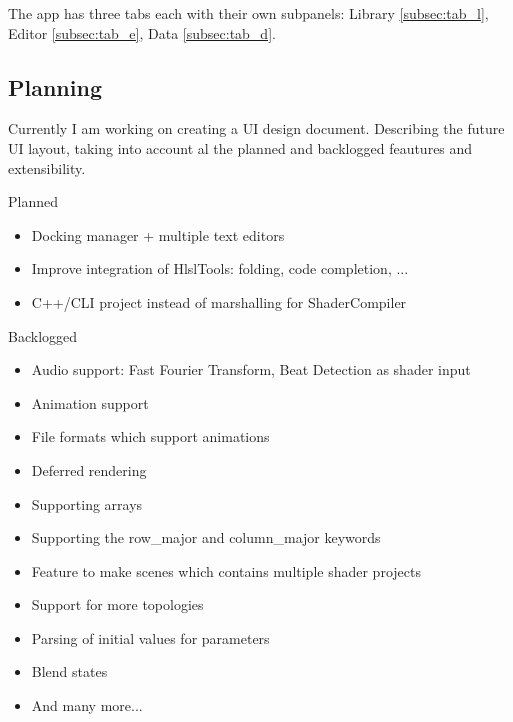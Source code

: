 \documentclass{paper}
\newcommand*\bracket[1]{\lbrack#1\rbrack} %
\begin{document}
\par
The app has three tabs each with their own subpanels: Library \bracket{\ref{subsec:tab_l}}, Editor \bracket{\ref{subsec:tab_e}}, Data \bracket{\ref{subsec:tab_d}}.

\newpage
\subsection{Planning}
Currently I am working on creating a UI design document. Describing the future UI layout, taking into account al the planned and backlogged feautures and extensibility.
\par
Planned
\begin{itemize}[noitemsep]
	\item Docking manager + multiple text editors
	\item Improve integration of HlslTools: folding, code completion, ...
	\item C++/CLI project instead of marshalling for ShaderCompiler
\end{itemize}

Backlogged
\begin{itemize}[noitemsep]
\item Audio support: Fast Fourier Transform, Beat Detection as shader input
\item Animation support
\item File formats which support animations
\item Deferred rendering
\item Supporting arrays
\item Supporting the row\_major and column\_major keywords
\item Feature to make scenes which contains multiple shader projects
\item Support for more topologies
\item Parsing of initial values for parameters
\item Blend states
\item And many more...
\end{itemize}

\newpage
\end{document}
